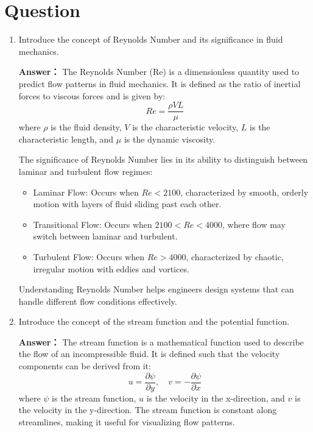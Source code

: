 \documentclass[12pt,a4paper]{article}
\newcounter{question}
\newenvironment{questions}{
    \setcounter{question}{0}
    \section*{Question}
    \begin{enumerate}[leftmargin=1.5em,label={\arabic*．}]
}{
    \end{enumerate}
}
\newcommand{\answer}[1]{\par\noindent\textbf{Answer：} #1\par\vspace{1em}}
\begin{document}
\begin{questions}
{      Also,we can compare the continuity formula of incompressible flow with compressible flow:
      \[
      \nabla \cdot \mathbf{V} = 0 \quad \text{(incompressible flow)}
      \]
      \[
      \frac{\partial \rho}{\partial t} + \nabla \cdot (\rho \mathbf{V}) = 0 \quad \text{(compressible flow)}
      \]

      The deprivation of the continuity equation for compressible flow is as follows:
      
      the rate of mass outflow from a control volume is equal to the rate of mass inflow plus the rate of change of mass within the control volume. This can be expressed mathematically as:
      $$\text{outflow rate} = \nabla \cdot (\rho \mathbf{V})$$
      the mass derivative is given by:
      $$\text{mass derivative} = \frac{\partial \rho}{\partial t} \mathbf{V}$$
      Therefore, the continuity equation for compressible flow can be expressed as:
      \[\frac{\partial \rho}{\partial t} + \nabla \cdot (\rho \mathbf{V}) = 0
      \]
      }

      \item Introduce the concept of Reynolds Number and its significance in fluid mechanics.
      \answer{
        The Reynolds Number (Re) is a dimensionless quantity used to predict flow patterns in fluid mechanics. It is defined as the ratio of inertial forces to viscous forces and is given by:
        \[
        Re = \frac{\rho V L}{\mu}
        \]
        where $\rho$ is the fluid density, $V$ is the characteristic velocity, $L$ is the characteristic length, and $\mu$ is the dynamic viscosity.

        The significance of Reynolds Number lies in its ability to distinguish between laminar and turbulent flow regimes:
        \begin{itemize}
          \item Laminar Flow: Occurs when $Re < 2100$, characterized by smooth, orderly motion with layers of fluid sliding past each other.
          \item Transitional Flow: Occurs when $2100 < Re < 4000$, where flow may switch between laminar and turbulent.
          \item Turbulent Flow: Occurs when $Re > 4000$, characterized by chaotic, irregular motion with eddies and vortices.
        \end{itemize}
        Understanding Reynolds Number helps engineers design systems that can handle different flow conditions effectively.
      }

      \item Introduce the concept of the stream function and the potential function.
      \answer{
        The stream function is a mathematical function used to describe the flow of an incompressible fluid. It is defined such that the velocity components can be derived from it:
        \[
        u = \frac{\partial \psi}{\partial y}, \quad v = -\frac{\partial \psi}{\partial x}
        \]
        where $\psi$ is the stream function, $u$ is the velocity in the x-direction, and $v$ is the velocity in the y-direction. The stream function is constant along streamlines, making it useful for visualizing flow patterns.

}
\end{questions}
\end{document}
